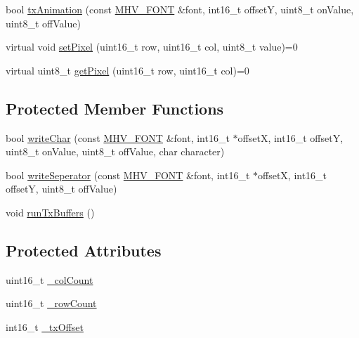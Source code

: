 \begin{DoxyCompactItemize}
\item 
bool \hyperlink{class_m_h_v___display___monochrome_a2a2a31b95c62535cd378880f27e0a148}{tx\-Animation} (const \hyperlink{_m_h_v___font_8h_ab7088ba808ac223275dfd526d198356f}{\-M\-H\-V\-\_\-\-F\-O\-N\-T} \&font, int16\-\_\-t offset\-Y, uint8\-\_\-t on\-Value, uint8\-\_\-t off\-Value)
\item 
virtual void \hyperlink{class_m_h_v___display___monochrome_a58a17e8662802e7f5d6ccd6f0bcc51a0}{set\-Pixel} (uint16\-\_\-t row, uint16\-\_\-t col, uint8\-\_\-t value)=0
\item 
virtual uint8\-\_\-t \hyperlink{class_m_h_v___display___monochrome_a80573e21b6b455fdd79c9d7d0a981492}{get\-Pixel} (uint16\-\_\-t row, uint16\-\_\-t col)=0
\end{DoxyCompactItemize}
\subsection*{\-Protected \-Member \-Functions}
\begin{DoxyCompactItemize}
\item 
bool \hyperlink{class_m_h_v___display___monochrome_ad0321aa7b9fa5a0de26ad5e4ff17f006}{write\-Char} (const \hyperlink{_m_h_v___font_8h_ab7088ba808ac223275dfd526d198356f}{\-M\-H\-V\-\_\-\-F\-O\-N\-T} \&font, int16\-\_\-t $\ast$offset\-X, int16\-\_\-t offset\-Y, uint8\-\_\-t on\-Value, uint8\-\_\-t off\-Value, char character)
\item 
bool \hyperlink{class_m_h_v___display___monochrome_ae4cedda8de71a496fde651ffcb9fabbf}{write\-Seperator} (const \hyperlink{_m_h_v___font_8h_ab7088ba808ac223275dfd526d198356f}{\-M\-H\-V\-\_\-\-F\-O\-N\-T} \&font, int16\-\_\-t $\ast$offset\-X, int16\-\_\-t offset\-Y, uint8\-\_\-t off\-Value)
\item 
void \hyperlink{class_m_h_v___display___monochrome_a7abdfbe71e00421a4275760ab6632b4a}{run\-Tx\-Buffers} ()
\end{DoxyCompactItemize}
\subsection*{\-Protected \-Attributes}
\begin{DoxyCompactItemize}
\item 
uint16\-\_\-t \hyperlink{class_m_h_v___display___monochrome_ae34bd61b8cffa2ee240bfe29f49a99d2}{\-\_\-col\-Count}
\item 
uint16\-\_\-t \hyperlink{class_m_h_v___display___monochrome_a29a7a7b8ceaf0ce0087002b9458d5074}{\-\_\-row\-Count}
\item 
int16\-\_\-t \hyperlink{class_m_h_v___display___monochrome_a75607cd77067ab059e8962e666593d4e}{\-\_\-tx\-Offset}
\end{DoxyCompactItemize}


